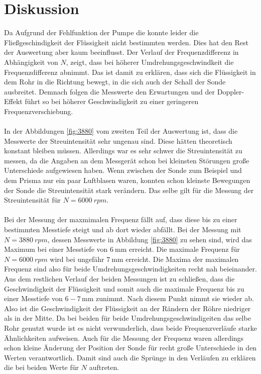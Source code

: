 \section{Diskussion}
\label{sec:Diskussion}

Da Aufgrund der Fehlfunktion der Pumpe die konnte leider die Fließgeschindigkeit der Flüssigkeit nicht bestimmten werden.
Dies hat den Rest der Auswertung aber kaum beeinflusst.
Der Verlauf der Frequenzdifferenz in Abhängigkeit von $N$, zeigt, dass bei höherer Umdrehungsgeschwindkeit die Frequenzdifferenz abnimmt.
Das ist damit zu erklären, dass sich die Flüssigkeit in dem Rohr in die Richtung bewegt, in die sich auch der Schall der Sonde ausbreitet.
Demnach folgen die Messwerte den Erwartungen und der Doppler-Effekt führt so bei höherer Geschwindigkeit zu einer geringeren Frequenzverschiebung.
\\\\
In der Abbildungen \ref{fig:3880} vom zweiten Teil der Auswertung ist, dass die Messwerte der Streuintensität sehr ungenau sind.
Diese hätten theoretisch konstant bleiben müssen.
Allerdings war es sehr schwer die Streuintensität zu messen, da die Angaben an dem Messgerät schon bei kleinsten Störungen große Unterschiede aufgewiesen haben.
Wenn zwischen der Sonde zum Beispiel und dem Prisma  nur ein paar Luftblasen waren, konnten schon kleinste Bewegungen der Sonde die Streuintensität stark verändern.
Das selbe gilt für die Messung der Streuintensität für $N=\SI{6000}{rpm}$.
\\\\
Bei der Messung der maxmimalen Frequenz fällt auf, dass diese bis zu einer bestimmten Messtiefe steigt und ab dort wieder abfällt.
Bei der Messung mit $N=\SI{3880}{rpm}$, dessen Messwerte in Abbildung \ref{fig:3880} zu sehen sind, wird das Maximum bei einer Messtiefe von $\SI{6}{\milli\meter}$ erreicht.
Die maximale Frequenz für $N=\SI{6000}{rpm}$ wird bei ungefähr $\SI{7}{\milli\meter}$ erreicht.
Die Maxima der maximalen Frequenz sind also für beide Umdrehungsgeschwindigkeiten recht nah beieinander.
Aus dem restlichen Verlauf der beiden Messungen ist zu schließen, dass die Geschwindigkeit der Flüssigkeit und somit auch die maximale Frequenz bis zu einer Messtiefe von $6-7 \,\si{\milli\meter}$ zunimmt.
Nach diesem Punkt nimmt sie wieder ab.
Also ist die Geschwindigkeit der Flüssigkeit an der Rändern der Röhre niedriger als in der Mitte.
Da bei beiden für beide Umdrehungsgeschwindigeiten das selbe Rohr genutzt wurde ist es nicht verwunderlich, dass beide Frequenzverläufe starke Ähnlichkeiten aufweisen.
Auch für die Messung der Frequenz waren allerdings schon kleine Änderung der Position der Sonde für recht große Unterschiede in den Werten verantwortlich.
Damit sind auch die Sprünge in den Verläufen zu erklären die bei beiden Werte für $N$ auftreten.